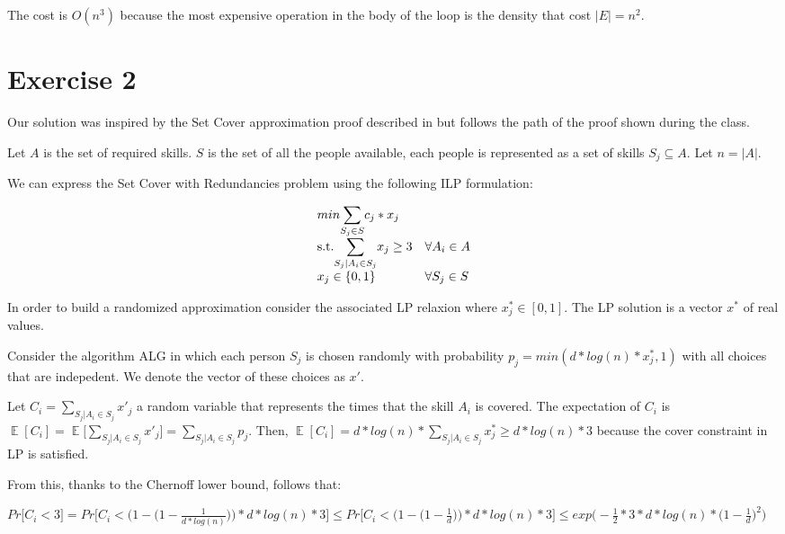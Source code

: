 \documentclass[paper=a4, fontsize=11pt]{scrartcl} %
\numberwithin{equation}{section} %
\numberwithin{figure}{section} %
\numberwithin{table}{section} %
\DeclareMathOperator*{\E}{\mathbb{E}}
\begin{document}
The cost is $O(n^3)$ because the most expensive operation in the body of the loop is the density that cost $|E|=n^2$.

\section{Exercise 2}

Our solution was inspired by the Set Cover approximation proof described in \cite{wikiset} but follows the path of the proof shown during the class.

Let $A$ is the set of required skills. $S$ is the set of all the people available, each people is represented as a set of skills $S_j \subseteq A$. Let $n = |A|$.

We can express the Set Cover with Redundancies problem using the following ILP formulation:

\[
    \begin{array}{ll}
    min \mathlarger{\sum}_{S_j \in S} c_j*x_j & \\
    \text{s.t.} \mathlarger{\sum}_{S_j | A_i \in S_j} x_j \geq 3 & \forall A_i \in A \\
    x_j \in \{0, 1\} & \forall S_j \in S \\
    \end{array}
\]

In order to build a randomized approximation consider the associated LP relaxion where $x^*_j \in [0, 1]$. The LP solution is a vector $x^*$ of real values.

Consider the algorithm ALG in which each person $S_j$ is chosen randomly with probability $p_j = min(d*log(n)*x^*_j, 1)$ with all choices that are indepedent.
We denote the vector of these choices as $x'$.

Let $C_i = \sum_{S_j | A_i \in S_j} x'_j$ a random variable that represents the times that the skill $A_i$ is covered.
The expectation of $C_i$ is $\E[C_i] = \E\Big[\sum_{S_j | A_i \in S_j} x'_j\Big] = \sum_{S_j | A_i \in S_j} p_j$.
Then, $\E[C_i] = d*log(n)*\sum_{S_j | A_i \in S_j} x^*_j \geq d*log(n)*3$ because the cover constraint in LP is satisfied.

From this, thanks to the Chernoff lower bound, follows that:

\bigskip
$Pr\Big[C_i < 3\Big] = Pr\Big[C_i < \Big(1 - \Big(1 - \frac{1}{d*log(n)}\Big)\Big)*d*log(n)*3\Big] \leq Pr\Big[C_i < \Big(1 - \Big(1 - \frac{1}{d}\Big)\Big)*d*log(n)*3\Big] \leq exp\bigg(-\frac{1}{2}*3*d*log(n)*\Big(1 - \frac{1}{d}\Big)^2\bigg)$
\bigskip
\end{document}
